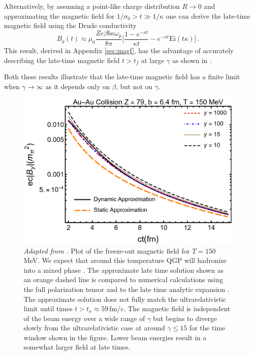 Alternatively, by assuming a point-like charge distribution $R\rightarrow0$ and approximating the magnetic field for $ 1/\sigma_0 > t\gg 1/\kappa$ one can derive the late-time magnetic field using the Drude conductivity 
\begin{equation}\label{eq:latetimeB}
   B_y(t) \approx  \mu_0 \frac{ Ze \beta b \kappa \omega_p }{8\pi}\bigg[ \frac{1- e^{-\kappa t}}{\kappa t} - e^{-\kappa t} \text{Ei}\left(t\kappa\right)\bigg]\,.
\end{equation}
This result, derived in Appendix \ref{sec:magf}, has the advantage of accurately describing the late-time magnetic field $t>t_f$  at large $\gamma$ as shown in .

Both these results illustrate that the late-time magnetic field has a finite limit when $\gamma\rightarrow\infty$ as it depends only on $\beta$, but not on $\gamma$.
\begin{figure}
\centering
\includegraphics[width=0.85\linewidth]{plots/chap02QCD/bfgaamacomp.png}
    \caption{\textit{Adapted from \cite{Grayson:2022asf}.} Plot of the freeze-out magnetic field for $T= 150$\,MeV. We expect that around this temperature QGP will hadronize into a mixed phase \cite{Letessier:1992xd}. The approximate late time solution  shown as an orange dashed line is compared to numerical calculations using the full polarization tensor  and to the late time analytic expansion . The approximate solution does not fully match the ultrarelativistic limit until times $t > t_{\sigma} \approx 59$\,fm/c. The magnetic field is independent of the beam energy over a wide range of $\gamma$ but begins to diverge slowly from the ultrarelativistic case at around $\gamma \leq 15$ for the time window shown in the figure. Lower beam energies result in a somewhat larger field at late times.\label{fig:bcolcomp}}
\end{figure}
